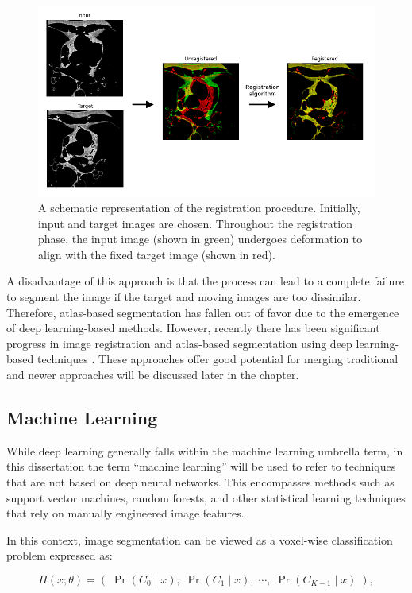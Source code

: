 \begin{figure}[h!]
 \centering
 \includegraphics[width=0.7\linewidth]{images/registration.png}
 \caption{A schematic representation of the registration procedure. Initially, input and target images are chosen. Throughout the registration phase, the input image (shown in green) undergoes deformation to align with the fixed target image (shown in red). \cite{bencevicRecentProgressEpicardial2022}}
 \label{fig:registration}
 \end{figure}

A disadvantage of this approach is that the process can lead to a complete failure to segment the image if the target and moving images are too dissimilar. Therefore, atlas-based segmentation has fallen out of favor due to the emergence of deep learning-based methods. However, recently there has been significant progress in image registration and atlas-based segmentation using deep learning-based techniques \cite{sinclairAtlasISTNJointSegmentation2022a}. These approaches offer good potential for merging traditional and newer approaches will be discussed later in the chapter.

\subsection{Machine Learning}

While deep learning generally falls within the machine learning umbrella term, in this dissertation the term ``machine learning'' will be used to refer to techniques that are not based on deep neural networks. This encompasses methods such as support vector machines, random forests, and other statistical learning techniques that rely on manually engineered image features.

In this context, image segmentation can be viewed as a voxel-wise classification problem expressed as:

\begin{equation}
H(x; \theta) = (\;\operatorname{Pr}(C_0\!\mid\!x),\; \operatorname{Pr}(C_1\!\mid\!x),\; \cdots,\; \operatorname{Pr}(C_{K-1}\!\mid\!x)\;),
\end{equation}

